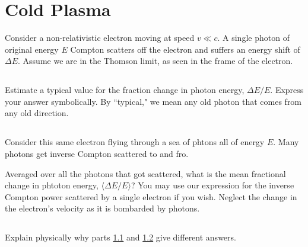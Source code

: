 \documentclass[11pt]{article}
\begin{document}
\section{Cold Plasma}

Consider a non-relativistic electron moving at speed $v\ll c$.  A single photon
of original energy $E$ Compton scatters off the electron and suffers an energy shift
of $\Delta E$.  Assume we are in the Thomson limit, as seen in the frame of the electron.

\subsection{}\label{sec:parta}
Estimate a typical value for the fraction change in photon energy, $\Delta E/E$.  Express your
answer symbolically.  By ``typical," we mean any old photon that comes from any old direction.

\subsection{}\label{sec:partb}
Consider this same electron flying through a sea of phtons all of energy $E$.  Many photons
get inverse Compton scattered to and fro.

Averaged over all the photons that got scattered, what is the mean fractional change
in phtoton energy, $\langle \Delta E/E\rangle$?  You may use our expression for the
inverse Compton power scattered by a single electron if you wish.  Neglect the change in the electron's velocity
as it is bombarded by photons.

\subsection{}
Explain physically why parts \ref{sec:parta} and \ref{sec:partb} give different answers.
\end{document}
